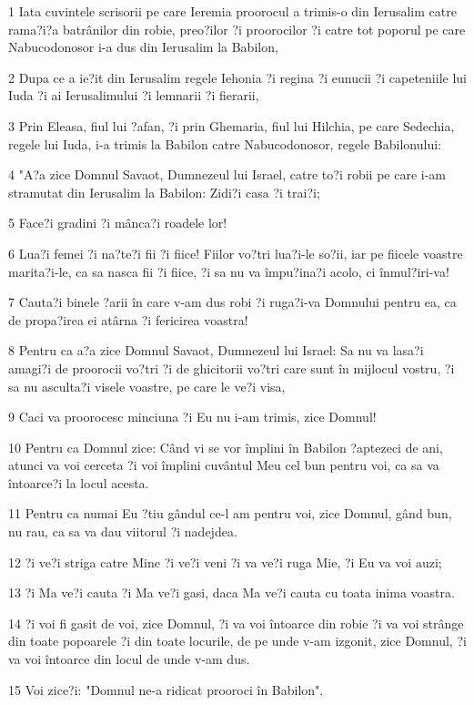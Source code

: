 \par 1 Iata cuvintele scrisorii pe care Ieremia proorocul a trimis-o din Ierusalim catre rama?i?a batrânilor din robie, preo?ilor ?i proorocilor ?i catre tot poporul pe care Nabucodonosor i-a dus din Ierusalim la Babilon,
\par 2 Dupa ce a ie?it din Ierusalim regele Iehonia ?i regina ?i eunucii ?i capeteniile lui Iuda ?i ai Ierusalimului ?i lemnarii ?i fierarii,
\par 3 Prin Eleasa, fiul lui ?afan, ?i prin Ghemaria, fiul lui Hilchia, pe care Sedechia, regele lui Iuda, i-a trimis la Babilon catre Nabucodonosor, regele Babilonului:
\par 4 "A?a zice Domnul Savaot, Dumnezeul lui Israel, catre to?i robii pe care i-am stramutat din Ierusalim la Babilon: Zidi?i casa ?i trai?i;
\par 5 Face?i gradini ?i mânca?i roadele lor!
\par 6 Lua?i femei ?i na?te?i fii ?i fiice! Fiilor vo?tri lua?i-le so?ii, iar pe fiicele voastre marita?i-le, ca sa nasca fii ?i fiice, ?i sa nu va împu?ina?i acolo, ci înmul?iri-va!
\par 7 Cauta?i binele ?arii în care v-am dus robi ?i ruga?i-va Domnului pentru ea, ca de propa?irea ei atârna ?i fericirea voastra!
\par 8 Pentru ca a?a zice Domnul Savaot, Dumnezeul lui Israel: Sa nu va lasa?i amagi?i de proorocii vo?tri ?i de ghicitorii vo?tri care sunt în mijlocul vostru, ?i sa nu asculta?i visele voastre, pe care le ve?i visa,
\par 9 Caci va proorocesc minciuna ?i Eu nu i-am trimis, zice Domnul!
\par 10 Pentru ca Domnul zice: Când vi se vor împlini în Babilon ?aptezeci de ani, atunci va voi cerceta ?i voi împlini cuvântul Meu cel bun pentru voi, ca sa va întoarce?i la locul acesta.
\par 11 Pentru ca numai Eu ?tiu gândul ce-l am pentru voi, zice Domnul, gând bun, nu rau, ca sa va dau viitorul ?i nadejdea.
\par 12 ?i ve?i striga catre Mine ?i ve?i veni ?i va ve?i ruga Mie, ?i Eu va voi auzi;
\par 13 ?i Ma ve?i cauta ?i Ma ve?i gasi, daca Ma ve?i cauta cu toata inima voastra.
\par 14 ?i voi fi gasit de voi, zice Domnul, ?i va voi întoarce din robie ?i va voi strânge din toate popoarele ?i din toate locurile, de pe unde v-am izgonit, zice Domnul, ?i va voi întoarce din locul de unde v-am dus.
\par 15 Voi zice?i: "Domnul ne-a ridicat prooroci în Babilon".
